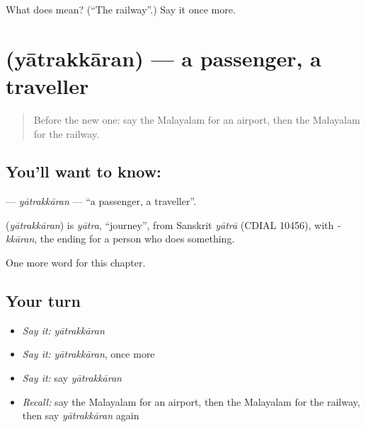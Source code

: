 \begin{tcolorbox}[breakable,colback=teal!4,colframe=teal!35!black,title={Before you move on}]
What does  mean? (\textquotedblleft{}The railway\textquotedblright{}.) Say it once more.
\end{tcolorbox}
\section[\texorpdfstring{\ml{യാത്രക്കാരൻ} (yātrakkāran)}{യാത്രക്കാരൻ (yātrakkāran)}]{ (yātrakkāran) — a passenger, a traveller}

\label{lesson:ML-C238-yatrakkaran}



\begin{quote}
Before the new one: say the Malayalam for an airport, then the Malayalam for the railway.
\end{quote}

\subsection*{You'll want to know: }
\textbf{} — \emph{yātrakkāran} — \textquotedblleft{}a passenger, a traveller\textquotedblright{}.

\begin{cousinweb}
\textbf{} (\emph{yātrakkāran}) is \emph{yātra}, \textquotedblleft{}journey\textquotedblright{}, from Sanskrit \emph{yātrā} (CDIAL 10456), with \emph{-kkāran}, the ending for a person who does something.
\end{cousinweb}

\begin{grammarlens}[title={What you've built}]
One more word for this chapter.
\end{grammarlens}

\subsection*{Your turn}
\begin{itemize}
\raggedright
  \item \emph{Say it:} \emph{yātrakkāran}
  \item \emph{Say it:} \emph{yātrakkāran}, once more
  \item \emph{Say it:} say \emph{yātrakkāran}
  \item \emph{Recall:} say the Malayalam for an airport, then the Malayalam for the railway, then say \emph{yātrakkāran} again
\end{itemize}

